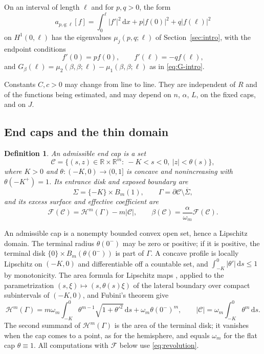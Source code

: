 \documentclass[11pt,a4paper]{article}
\numberwithin{equation}{section}
\theoremstyle{paperplain}
\newtheorem{definition}[theorem]{Definition}
\theoremstyle{remark}
\newcommand{\R}{\mathbb{R}}
\newcommand{\C}{\mathcal{C}}
\newcommand{\HH}{\mathcal{H}}
\newcommand{\dd}{\,\mathrm d}
\begin{document}
On an interval of length $\ell$ and for $p,q>0$, the form
\begin{equation}\label{eq:interval-form}
 a_{p,q;\ell}[f]=\int_0^\ell |f'|^2\dd x+p|f(0)|^2+q|f(\ell)|^2
\end{equation}
on $H^1(0,\ell)$ has the eigenvalues $\mu_j(p,q;\ell)$ of
Section~\ref{sec:intro}, with the endpoint conditions
\[
 f'(0)=p f(0),\qquad f'(\ell)=-q f(\ell),
\]
and $G_\beta(\ell)=\mu_2(\beta,\beta;\ell)-\mu_1(\beta,\beta;\ell)$ as in
\eqref{eq:G-intro}.

Constants $C,c>0$ may change from line to line. They are independent of $R$
and of the functions being estimated, and may depend on $n$, $\alpha$, $L$,
on the fixed caps, and on $J$.

\subsection{End caps and the thin domain}
\begin{definition}\label{def:cap}
An \emph{admissible end cap} is a set
\begin{equation}\label{eq:cap-definition}
 \C=\{(s,z)\in\R\times\R^m:\ -K<s<0,\ |z|<\theta(s)\},
\end{equation}
where $K>0$ and $\theta:(-K,0)\to(0,1]$ is concave and nonincreasing with
$\theta(-K^+)=1$. Its \emph{entrance disk} and \emph{exposed boundary} are
\[
 \Sigma=\{-K\}\times B_m(1),\qquad \Gamma=\partial\C\setminus\overline\Sigma,
\]
and its \emph{excess surface} and \emph{effective coefficient} are
\begin{equation}\label{eq:beta-definition}
 \mathcal F(\C)=\HH^m(\Gamma)-m|\C|,\qquad
 \beta(\C)=\frac{\alpha}{\omega_m}\mathcal F(\C).
\end{equation}
\end{definition}

An admissible cap is a nonempty bounded convex open set, hence a Lipschitz
domain. The terminal radius $\theta(0^-)$ may be zero or positive; if it is
positive, the terminal disk $\{0\}\times B_m(\theta(0^-))$ is part of
$\Gamma$. A concave profile is locally Lipschitz on $(-K,0)$ and
differentiable off a countable set, and $\int_{-K}^0|\theta'|\dd s\le1$ by
monotonicity. The area formula for Lipschitz maps
\cite[Chapter~3]{EvansGariepy}, applied to the parametrization
$(s,\xi)\mapsto(s,\theta(s)\xi)$ of the lateral boundary over compact
subintervals of $(-K,0)$, and Fubini's theorem give
\begin{equation}\label{eq:revolution}
 \HH^m(\Gamma)=m\omega_m\int_{-K}^0\theta^{m-1}\sqrt{1+\theta'^2}\dd s
   +\omega_m\theta(0^-)^m,
 \qquad
 |\C|=\omega_m\int_{-K}^0\theta^m\dd s.
\end{equation}
The second summand of $\HH^m(\Gamma)$ is the area of the terminal disk; it
vanishes when the cap comes to a point, as for the hemisphere, and equals
$\omega_m$ for the flat cap $\theta\equiv1$. All computations with
$\mathcal F$ below use \eqref{eq:revolution}.
\end{document}
